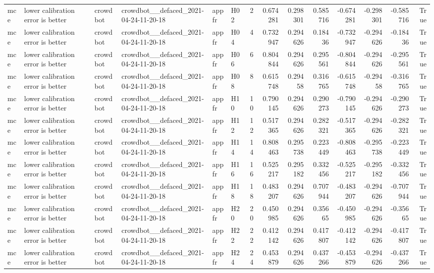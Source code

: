 \begin{longtable}{llllllrrrrrrrr}
mce & lower calibration error is better & crowdbot & crowdbot\_\_defaced\_2021-04-24-11-20-18 & appfr & H02 & 2 & 0.674281 & 0.298301 & 0.585716 & -0.674281 & -0.298301 & -0.585716 & True \\
mce & lower calibration error is better & crowdbot & crowdbot\_\_defaced\_2021-04-24-11-20-18 & appfr & H04 & 4 & 0.732947 & 0.294626 & 0.18436 & -0.732947 & -0.294626 & -0.18436 & True \\
mce & lower calibration error is better & crowdbot & crowdbot\_\_defaced\_2021-04-24-11-20-18 & appfr & H06 & 6 & 0.804844 & 0.294626 & 0.295561 & -0.804844 & -0.294626 & -0.295561 & True \\
mce & lower calibration error is better & crowdbot & crowdbot\_\_defaced\_2021-04-24-11-20-18 & appfr & H08 & 8 & 0.615748 & 0.29458 & 0.316765 & -0.615748 & -0.29458 & -0.316765 & True \\
mce & lower calibration error is better & crowdbot & crowdbot\_\_defaced\_2021-04-24-11-20-18 & appfr & H10 & 10 & 0.790145 & 0.294626 & 0.290273 & -0.790145 & -0.294626 & -0.290273 & True \\
mce & lower calibration error is better & crowdbot & crowdbot\_\_defaced\_2021-04-24-11-20-18 & appfr & H12 & 12 & 0.517365 & 0.294626 & 0.282321 & -0.517365 & -0.294626 & -0.282321 & True \\
mce & lower calibration error is better & crowdbot & crowdbot\_\_defaced\_2021-04-24-11-20-18 & appfr & H14 & 14 & 0.808463 & 0.295738 & 0.223449 & -0.808463 & -0.295738 & -0.223449 & True \\
mce & lower calibration error is better & crowdbot & crowdbot\_\_defaced\_2021-04-24-11-20-18 & appfr & H16 & 16 & 0.525217 & 0.295182 & 0.332456 & -0.525217 & -0.295182 & -0.332456 & True \\
mce & lower calibration error is better & crowdbot & crowdbot\_\_defaced\_2021-04-24-11-20-18 & appfr & H18 & 18 & 0.483207 & 0.294626 & 0.707944 & -0.483207 & -0.294626 & -0.707944 & True \\
mce & lower calibration error is better & crowdbot & crowdbot\_\_defaced\_2021-04-24-11-20-18 & appfr & H20 & 20 & 0.450985 & 0.294626 & 0.35665 & -0.450985 & -0.294626 & -0.35665 & True \\
mce & lower calibration error is better & crowdbot & crowdbot\_\_defaced\_2021-04-24-11-20-18 & appfr & H22 & 22 & 0.412142 & 0.294626 & 0.417807 & -0.412142 & -0.294626 & -0.417807 & True \\
mce & lower calibration error is better & crowdbot & crowdbot\_\_defaced\_2021-04-24-11-20-18 & appfr & H24 & 24 & 0.453879 & 0.294626 & 0.437266 & -0.453879 & -0.294626 & -0.437266 & True \\

\end{longtable}
